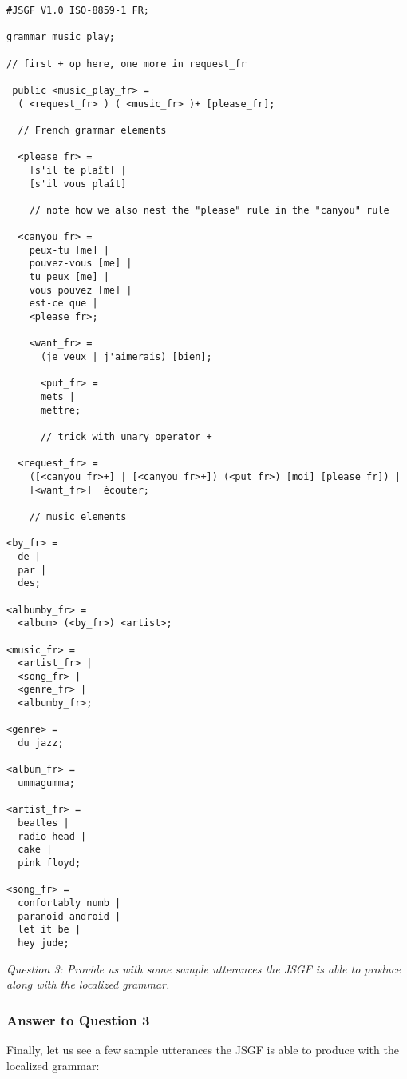 \documentclass[12pt, a4paper]{article}
\begin{document}
\begin{lstlisting}
#JSGF V1.0 ISO-8859-1 FR;

grammar music_play;

// first + op here, one more in request_fr

 public <music_play_fr> =
  ( <request_fr> ) ( <music_fr> )+ [please_fr];

  // French grammar elements
  
  <please_fr> = 
    [s'il te plaît] |
    [s'il vous plaît]
    
    // note how we also nest the "please" rule in the "canyou" rule
  
  <canyou_fr> = 
    peux-tu [me] |
    pouvez-vous [me] |
    tu peux [me] |
    vous pouvez [me] |
    est-ce que |
    <please_fr>;
    
    <want_fr> =
      (je veux | j'aimerais) [bien];
      
      <put_fr> =
      mets |
      mettre;
      
      // trick with unary operator + 
      
  <request_fr> = 
    ([<canyou_fr>+] | [<canyou_fr>+]) (<put_fr>) [moi] [please_fr]) |
    [<want_fr>]  écouter;
    
    // music elements
    
<by_fr> =
  de |
  par |
  des;

<albumby_fr> = 
  <album> (<by_fr>) <artist>;

<music_fr> = 
  <artist_fr> |
  <song_fr> | 
  <genre_fr> | 
  <albumby_fr>;

<genre> = 
  du jazz;

<album_fr> = 
  ummagumma;

<artist_fr> =
  beatles |
  radio head |
  cake |
  pink floyd;
  
<song_fr> =
  confortably numb |
  paranoid android |
  let it be |
  hey jude;
\end{lstlisting}

\emph{Question 3: Provide us with some sample utterances the JSGF is able to produce along with the localized
grammar.}

\subsubsection{Answer to Question 3}

Finally, let us see a few sample utterances the JSGF is able to produce with the localized grammar:
\end{document}
